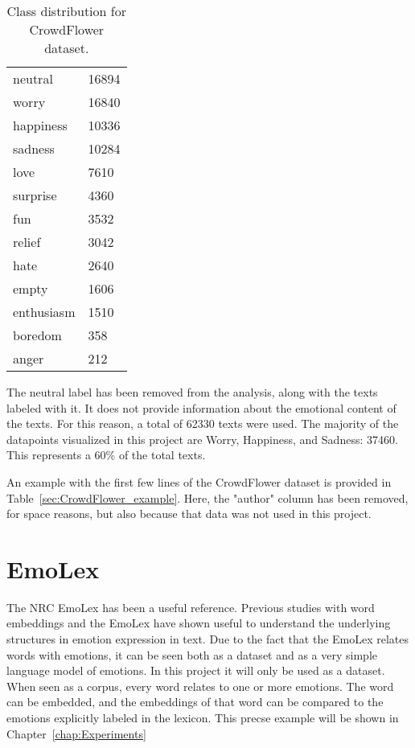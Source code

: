 \begin{table}
    \centering
    \begin{tabular}{|l|l|}
    \hline
      neutral     &  16894 \\
      worry       &  16840 \\
      happiness   &  10336 \\
      sadness     &  10284 \\
      love        &   7610 \\
      surprise    &   4360 \\
      fun         &   3532 \\
      relief      &   3042 \\
      hate        &   2640 \\
      empty       &   1606 \\
      enthusiasm  &   1510 \\
      boredom     &    358 \\
      anger       &    212 \\
    \end{tabular}
    \caption{Class distribution for CrowdFlower dataset.}\label{tab:CrowdFlower_distribution}
\end{table}
The neutral label has been removed from the analysis, along with the texts labeled with it. It does not provide information about the emotional content of the texts.
For this reason, a total of 62330 texts were used. The majority of the datapoints visualized in this project are Worry, Happiness, and Sadness: 37460. This represents a 60\% of the total texts.

An example with the first few lines of the CrowdFlower dataset is provided in Table~\ref{sec:CrowdFlower_example}. Here, the "author" column has been removed, for space reasons, but also because that data was not used in this project.

\section{EmoLex}\label{sec:EmoLex}
The NRC EmoLex has been a useful reference. Previous studies with word embeddings and the EmoLex have shown useful to understand the underlying structures in emotion expression in text. Due to the fact that the EmoLex relates words with emotions, it can be seen both as a dataset and as a very simple language model of emotions. In this project it will only be used as a dataset. When seen as a corpus, every word relates to one or more emotions. The word can be embedded, and the embeddings of that word can be compared to the emotions explicitly labeled in the lexicon. This precse example will be shown in Chapter~\ref{chap:Experiments}

